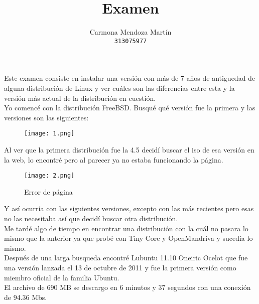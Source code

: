 \documentclass[11pt, a4paper]{report}
\begin{document}
\title{Examen}
\author{
  Carmona Mendoza Martín\\
  \texttt{313075977}
}
\date{}
\maketitle

Este examen consiste en instalar una versión con más de 7 años de antiguedad de
alguna distribución de Linux y ver cuáles son las diferencias entre esta y la
versión más actual de la distribución en cuestión. \\

Yo comencé con la distribución FreeBSD. Busqué qué versión fue la primera y las
versiones son las siguientes: \\

\begin{figure}[!ht] 
    \begin{center}  
      \texttt{[image: 1.png]} 
      \caption{} 
    \end{center} 
  \end{figure} 

Al ver que la primera distribución fue la 4.5 decidí buscar el iso de esa
versión en la web, lo encontré pero al parecer ya no estaba funcionando la
página. \\

  \begin{figure}[!ht] 
    \begin{center}  
      \texttt{[image: 2.png]} 
      \caption{Error de página} 
    \end{center} 
  \end{figure}

  Y así ocurría con las siguientes versiones, excepto con las más recientes pero
  esas no las necesitaba así que decidí buscar otra distribución. \\

  Me tardé algo de tiempo en encontrar una distribución con la cuál no pasara lo
  mismo que la anterior ya que probé con Tiny Core y OpenMandriva y sucedía lo
  mismo. \\

  Después de una larga busqueda encontré Lubuntu 11.10 Oneiric Ocelot que fue
  una versión lanzada el 13 de octubre de 2011 y fue la primera versión como
  miembro oficial de la familia Ubuntu.  \\

  El archivo de 690 MB se descargo en 6 minutos y 37 segundos con una conexión
  de 94.36 Mbs. \\
\end{document}
